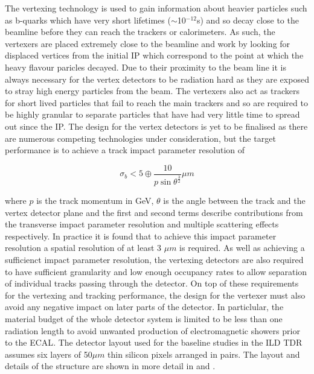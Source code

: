 The vertexing technology is used to gain information about heavier particles such as b-quarks which have very short lifetimes ($\sim$10$^{-12}$s) and so decay close to the beamline before they can reach the trackers or calorimeters. As such, the vertexers are placed extremely close to the beamline and work by looking for displaced vertices from the initial \ac{IP} which correspond to the point at which the heavy flavour paricles decayed. Due to their proximity to the beam line it is always necessary for the vertex detectors to be radiation hard as they are exposed to stray high energy particles from the beam. The vertexers also act as trackers for short lived particles that fail to reach the main trackers and so are required to be highly granular to separate particles that have had very little time to spread out since the \ac{IP}. The design for the vertex detectors is yet to be finalised as there are numerous competing technologies under consideration, but the target performance is to achieve a track impact parameter resolution of

\begin{equation}
\sigma_{b} < 5 \oplus \frac{10}{p\sin\theta^{\frac{3}{2}}}\mu m
\end{equation}

where $p$ is the track momentum in GeV, $\theta$ is the angle between the track and the vertex detector plane and the first and second terms describe contributions from the transverse impact parameter resolution and multiple scattering effects respectively.  In practice it is found that to achieve this impact parameter resolution a spatial resolution of at least 3 $\mu m$ is required. As well as achieving a sufficienct impact parameter resolution, the vertexing detectors are also required to have sufficient granularity and low enough occupancy rates to allow separation of individual tracks passing through the detector. On top of these requirements for the vertexing and tracking performance, the design for the vertexer must also avoid any negative impact on later parts of the detector. In particlular, the material budget of the whole detector system is limited to be less than one radiation length to avoid unwanted production of electromagnetic showers prior to the \ac{ECAL}. The detector layout used for the baseline studies in the \ac{ILD} \ac{TDR} assumes six layers of 50$\mu m$ thin silicon pixels arranged in pairs. The layout and details of the structure are shown in more detail in  and .

